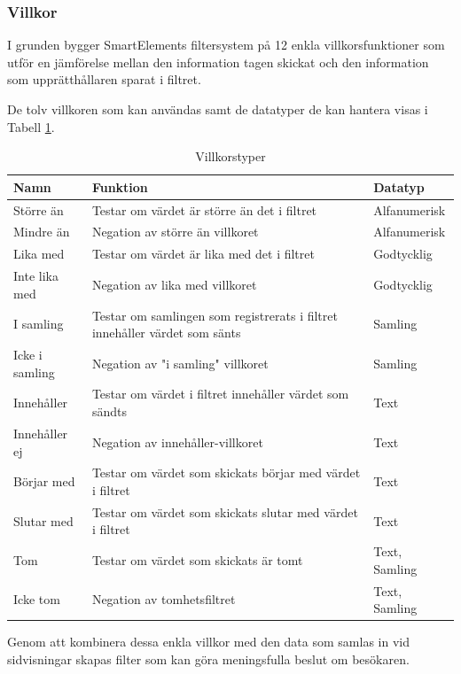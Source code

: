 \subsubsection{Villkor}

I grunden bygger SmartElements filtersystem på 12 enkla villkorsfunktioner som utför en jämförelse mellan den information tagen skickat och den information som upprätthållaren sparat i filtret.

De tolv villkoren som kan användas samt de datatyper de kan hantera visas i Tabell \ref{table:villkor}.

\begin{table}
    \begin{tabular}{|l|p{8cm}|l|}
    \hline
    Namn & Funktion & Datatyp \\
    \hline
    Större än & Testar om värdet är större än det i filtret & Alfanumerisk \\
    \hline
    Mindre än & Negation av större än villkoret & Alfanumerisk \\
    \hline
    Lika med & Testar om värdet är lika med det i filtret & Godtycklig \\
    \hline
    Inte lika med & Negation av lika med villkoret & Godtycklig \\
    \hline
    I samling & Testar om samlingen som registrerats i filtret innehåller värdet som sänts & Samling \\
    \hline
    Icke i samling & Negation av "i samling" villkoret & Samling \\
    \hline
    Innehåller & Testar om värdet i filtret innehåller värdet som sändts & Text \\
    \hline
    Innehåller ej & Negation av innehåller-villkoret & Text \\
    \hline
    Börjar med & Testar om värdet som skickats börjar med värdet i filtret & Text \\
    \hline
    Slutar med & Testar om värdet som skickats slutar med värdet i filtret & Text \\
    \hline
    Tom & Testar om värdet som skickats är tomt & Text, Samling \\
    \hline
    Icke tom & Negation av tomhetsfiltret & Text, Samling \\
    \hline
    \end{tabular}
    \caption{Villkorstyper}
    \label{table:villkor}
\end{table}

Genom att kombinera dessa enkla villkor med den data som samlas in vid sidvisningar skapas filter som kan göra meningsfulla beslut om besökaren.

